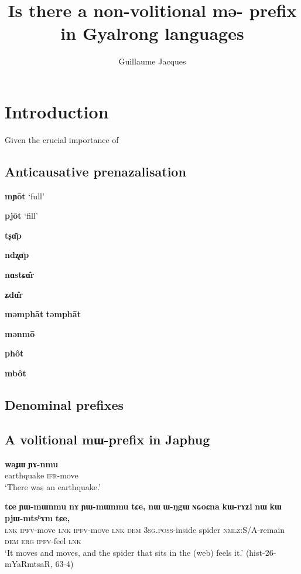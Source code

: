 \documentclass[oneside,a4paper,11pt]{article}
\newcommand{\ipa}[1]{\textbf{{\phon\mbox{#1}}}} %
\begin{document}
\title{Is there a non-volitional \ipa{mə-} prefix in Gyalrong languages}
\author{Guillaume Jacques}
\maketitle

\section*{Introduction}

Given the crucial importance of 
\citet{gong17xingtaixue}


\subsection{Anticausative prenazalisation}
\citet{sagart03prenasalized}
\citet{jacques15spontaneous, jacques15causative}


\citet[330]{huangsun02} \ipa{mɲōt} `full'

\citet[670]{huangsun02} \ipa{pjōt} `fill'

\citet[172]{huangsun02} \ipa{tʂɑ̄p} 

\citet[172]{huangsun02} \ipa{ndʐɑ̄p} 

\citet[469]{huangsun02} \ipa{nɑstɕɑ̂r} 

\citet[540]{huangsun02} \ipa{ʑdɑ̂r} 

\citet[371, 511]{huangsun02} \ipa{məmphāt} 
\citet[371]{huangsun02} \ipa{təmphāt}

\citet[105]{huangsun02} \ipa{mənmō}

\citet[271]{huangsun02} \ipa{phôt}

\citet[489]{huangsun02} \ipa{mbôt}
\subsection{Denominal prefixes}

\subsection{A volitional \ipa{mɯ-}prefix in Japhug}
 \citet{jacques16japhug}

\begin{exe}
\ex 
\gll
\ipa{waɟɯ} \ipa{ɲɤ-nmu} \\
earthquake \textsc{ifr}-move \\
\glt `There was an earthquake.'
\end{exe}

\begin{exe}
\ex 
\gll
\ipa{tɕe}	\ipa{ɲɯ-mɯnmu}	\ipa{nɤ}	\ipa{ɲɯ-mɯnmu}	\ipa{tɕe,}	\ipa{nɯ}	\ipa{ɯ-ŋgɯ}	\ipa{ɴɢoɕna}	\ipa{kɯ-rɤʑi}	\ipa{nɯ}	\ipa{kɯ}	\ipa{pjɯ-mtsʰɤm}	\ipa{tɕe,} \\
\textsc{lnk} \textsc{ipfv}-move \textsc{lnk}  \textsc{ipfv}-move \textsc{lnk} \textsc{dem} \textsc{3sg.poss}-inside spider \textsc{nmlz}:S/A-remain \textsc{dem} \textsc{erg} \textsc{ipfv}-feel \textsc{lnk} \\
\glt `It moves and moves, and the spider that sits in the (web) feels it.' (hist-26-mYaRmtsaR, 63-4)
\end{exe}
\end{document}
